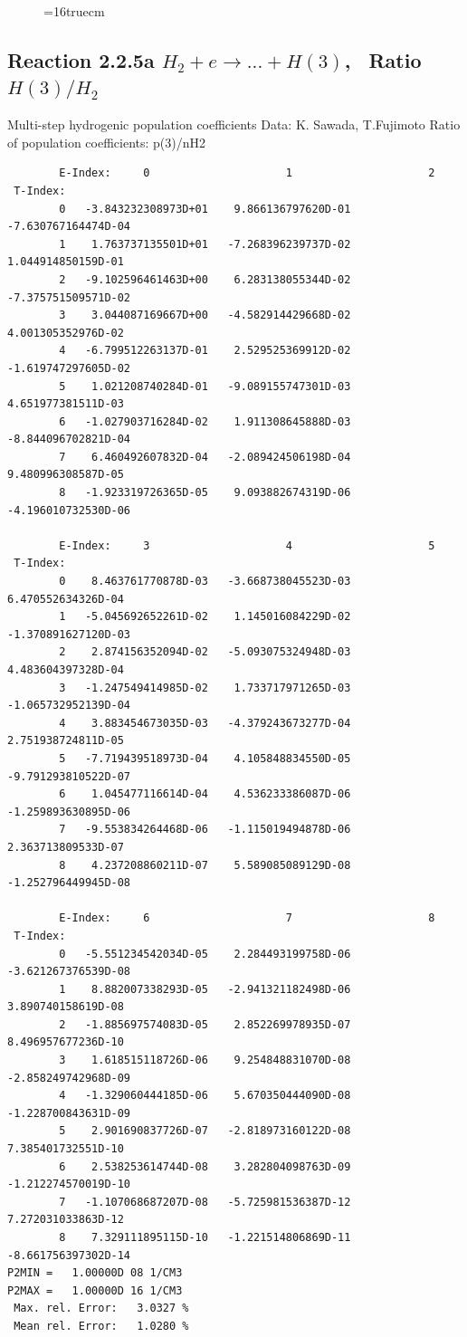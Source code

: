\documentclass[12pt,dvipdfmx]{article}
\begin{document}
\begin{figure} \label{2.3.6lr1}
\epsfxsize=16truecm
\end{figure}
\newpage

\subsection{
Reaction 2.2.5a $ H_2 + e \rightarrow ...+ H(3) $, \    Ratio $H(3)/H_2 $
}
 Multi-step hydrogenic population coefficients
 Data: K. Sawada, T.Fujimoto \cite{kn:Sawada}
 Ratio of population coefficients: p(3)/nH2


\begin{small}\begin{verbatim}
        E-Index:     0                     1                     2
 T-Index:
        0   -3.843232308973D+01    9.866136797620D-01   -7.630767164474D-04
        1    1.763737135501D+01   -7.268396239737D-02    1.044914850159D-01
        2   -9.102596461463D+00    6.283138055344D-02   -7.375751509571D-02
        3    3.044087169667D+00   -4.582914429668D-02    4.001305352976D-02
        4   -6.799512263137D-01    2.529525369912D-02   -1.619747297605D-02
        5    1.021208740284D-01   -9.089155747301D-03    4.651977381511D-03
        6   -1.027903716284D-02    1.911308645888D-03   -8.844096702821D-04
        7    6.460492607832D-04   -2.089424506198D-04    9.480996308587D-05
        8   -1.923319726365D-05    9.093882674319D-06   -4.196010732530D-06

        E-Index:     3                     4                     5
 T-Index:
        0    8.463761770878D-03   -3.668738045523D-03    6.470552634326D-04
        1   -5.045692652261D-02    1.145016084229D-02   -1.370891627120D-03
        2    2.874156352094D-02   -5.093075324948D-03    4.483604397328D-04
        3   -1.247549414985D-02    1.733717971265D-03   -1.065732952139D-04
        4    3.883454673035D-03   -4.379243673277D-04    2.751938724811D-05
        5   -7.719439518973D-04    4.105848834550D-05   -9.791293810522D-07
        6    1.045477116614D-04    4.536233386087D-06   -1.259893630895D-06
        7   -9.553834264468D-06   -1.115019494878D-06    2.363713809533D-07
        8    4.237208860211D-07    5.589085089129D-08   -1.252796449945D-08

        E-Index:     6                     7                     8
 T-Index:
        0   -5.551234542034D-05    2.284493199758D-06   -3.621267376539D-08
        1    8.882007338293D-05   -2.941321182498D-06    3.890740158619D-08
        2   -1.885697574083D-05    2.852269978935D-07    8.496957677236D-10
        3    1.618515118726D-06    9.254848831070D-08   -2.858249742968D-09
        4   -1.329060444185D-06    5.670350444090D-08   -1.228700843631D-09
        5    2.901690837726D-07   -2.818973160122D-08    7.385401732551D-10
        6    2.538253614744D-08    3.282804098763D-09   -1.212274570019D-10
        7   -1.107068687207D-08   -5.725981536387D-12    7.272031033863D-12
        8    7.329111895115D-10   -1.221514806869D-11   -8.661756397302D-14
P2MIN =   1.00000D 08 1/CM3
P2MAX =   1.00000D 16 1/CM3
 Max. rel. Error:   3.0327 %
 Mean rel. Error:   1.0280 %

\end{verbatim}\end{small}
\end{document}
